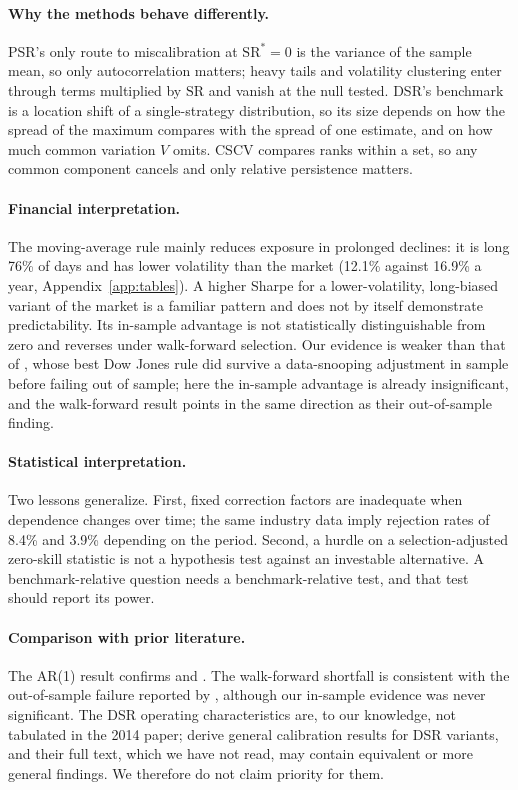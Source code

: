 \documentclass[11pt,a4paper]{article}
\newcommand{\SR}{\mathrm{SR}}
\theoremstyle{remark}
\begin{document}
\paragraph{Why the methods behave differently.} PSR's only route to miscalibration at $\SR^\ast=0$ is the variance of the sample mean, so only autocorrelation matters; heavy tails and volatility clustering enter through terms multiplied by $\SR$ and vanish at the null tested. DSR's benchmark is a location shift of a single-strategy distribution, so its size depends on how the spread of the maximum compares with the spread of one estimate, and on how much common variation $V$ omits. CSCV compares ranks within a set, so any common component cancels and only relative persistence matters.

\paragraph{Financial interpretation.} The moving-average rule mainly reduces exposure in prolonged declines: it is long 76\% of days and has lower volatility than the market (12.1\% against 16.9\% a year, Appendix~\ref{app:tables}). A higher Sharpe for a lower-volatility, long-biased variant of the market is a familiar pattern and does not by itself demonstrate predictability. Its in-sample advantage is not statistically distinguishable from zero and reverses under walk-forward selection. Our evidence is weaker than that of \citet{sullivan1999}, whose best Dow Jones rule did survive a data-snooping adjustment in sample before failing out of sample; here the in-sample advantage is already insignificant, and the walk-forward result points in the same direction as their out-of-sample finding.

\paragraph{Statistical interpretation.} Two lessons generalize. First, fixed correction factors are inadequate when dependence changes over time; the same industry data imply rejection rates of 8.4\% and 3.9\% depending on the period. Second, a hurdle on a selection-adjusted zero-skill statistic is not a hypothesis test against an investable alternative. A benchmark-relative question needs a benchmark-relative test, and that test should report its power.

\paragraph{Comparison with prior literature.} The AR(1) result confirms \citet{lo2002} and \citet[Remark~3.1]{ledoit2008}. The walk-forward shortfall is consistent with the out-of-sample failure reported by \citet{sullivan1999}, although our in-sample evidence was never significant. The DSR operating characteristics are, to our knowledge, not tabulated in the 2014 paper; \citet{lopezdeprado2026porcu} derive general calibration results for DSR variants, and their full text, which we have not read, may contain equivalent or more general findings. We therefore do not claim priority for them.
\end{document}
